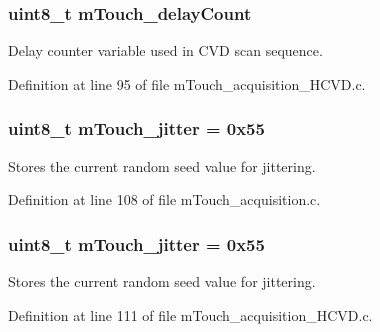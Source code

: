 \hypertarget{group___acquisition_gaf6d2f71af7a6dfd8571cbd141c40053e}{}
\subsubsection[{m\+Touch\+\_\+delay\+Count}]{\setlength{\rightskip}{0pt plus 5cm}uint8\+\_\+t m\+Touch\+\_\+delay\+Count}\label{group___acquisition_gaf6d2f71af7a6dfd8571cbd141c40053e}


Delay counter variable used in C\+V\+D scan sequence. 



Definition at line 95 of file m\+Touch\+\_\+acquisition\+\_\+\+H\+C\+V\+D.\+c.

\hypertarget{group___acquisition_ga800eae7ce7292a55c5d60975179ea26a}{}
\subsubsection[{m\+Touch\+\_\+jitter}]{\setlength{\rightskip}{0pt plus 5cm}uint8\+\_\+t m\+Touch\+\_\+jitter = 0x55}\label{group___acquisition_ga800eae7ce7292a55c5d60975179ea26a}


Stores the current random seed value for jittering. 



Definition at line 108 of file m\+Touch\+\_\+acquisition.\+c.

\hypertarget{group___acquisition_ga800eae7ce7292a55c5d60975179ea26a}{}
\subsubsection[{m\+Touch\+\_\+jitter}]{\setlength{\rightskip}{0pt plus 5cm}uint8\+\_\+t m\+Touch\+\_\+jitter = 0x55}\label{group___acquisition_ga800eae7ce7292a55c5d60975179ea26a}


Stores the current random seed value for jittering. 



Definition at line 111 of file m\+Touch\+\_\+acquisition\+\_\+\+H\+C\+V\+D.\+c.

